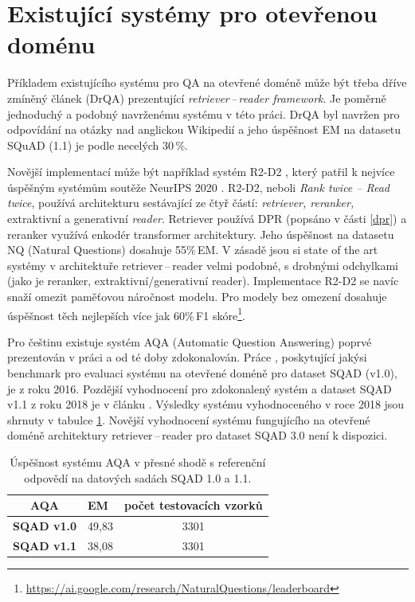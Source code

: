 \section{Existující systémy pro otevřenou doménu}
\label{existing_work}
Příkladem existujícího systému pro QA na otevřené doméně může být třeba dříve zmíněný článek \cite{drQA} (DrQA) prezentující \emph{retriever\,--\,reader framework}. Je poměrně jednoduchý a podobný navrženému systému v této práci. DrQA byl navržen pro odpovídání na otázky nad anglickou Wikipedií a jeho úspěšnost EM na datasetu SQuAD (1.1) je podle \cite{drQA} necelých 30\,\%.\par
Novější implementací může být například systém R2-D2 \cite{fajcik2021pruning}, který patřil k nejvíce úspěšným systémům soutěže NeurIPS 2020 \cite{min2021neurips}. R2-D2, neboli \textit{Rank twice -- Read twice}, používá architekturu sestávající ze čtyř částí: \emph{retriever, reranker, }extraktivní a generativní \emph{reader}. Retriever používá DPR \cite{dpr}(popsáno v části \ref{dpr}) a reranker využívá enkodér transformer architektury. Jeho úspěšnost na datasetu NQ (Natural Questions) dosahuje 55\%\,EM. V zásadě jsou si state of the art systémy v architektuře retriever\,--\,reader velmi podobné, s drobnými odchylkami (jako je reranker, extraktivní/generativní reader). Implementace \mbox{R2-D2} se navíc snaží omezit paměťovou náročnost modelu. Pro modely bez omezení dosahuje úspěšnost těch nejlepších více jak 60\%\,F1 skóre\footnote{\url{https://ai.google.com/research/NaturalQuestions/leaderboard}}.\par\medskip
Pro češtinu existuje systém AQA (Automatic Question Answering) poprvé prezentován v práci \cite{aqa} a od té doby zdokonalován. Práce \cite{aqa}, poskytující jakýsi benchmark pro evaluaci systému na otevřené doméně pro dataset SQAD (v1.0), je z roku 2016. Pozdější vyhodnocení pro zdokonalený systém a dataset SQAD v1.1 z roku 2018 je v článku \cite{aqa2018}. Výsledky systému vyhodnoceného v roce 2018 jsou shrnuty v tabulce \ref{tab:aqa_benchmark}. Novější vyhodnocení systému fungujícího na otevřené doméně architektury retriever\,--\,reader pro dataset SQAD 3.0 není k dispozici.
\begin{table}[H]
\centering
    \begin{tabular}{|l|l|c|}
    \hline
    \multicolumn{1}{|c|}{{\textbf{AQA}}} & EM    & \multicolumn{1}{l|}{počet testovacích vzorků} \\ \hline
    \textbf{SQAD v1.0}                       & 49,83 & 3301                                         \\ \hline
    \textbf{SQAD v1.1}                       & 38,08 & 3301                                         \\ \hline
    \end{tabular}
\caption{Úspěšnost systému AQA v přesné shodě s referenční odpovědí na datových sadách SQAD 1.0 a 1.1.}
\label{tab:aqa_benchmark}
\end{table}

